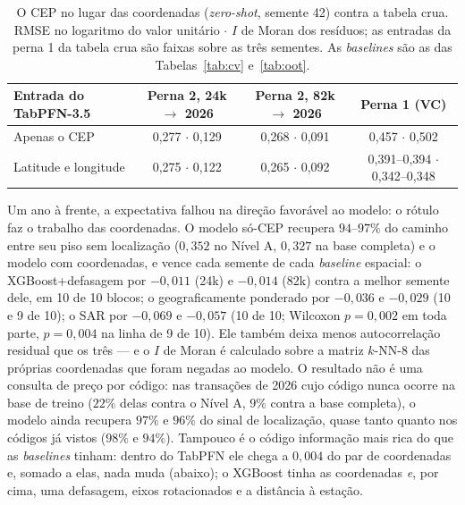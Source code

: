 \documentclass[11pt,a4paper]{article}
\begin{document}
\begin{table}[h]
\centering\small
\caption{O CEP no lugar das coordenadas (\emph{zero-shot}, semente 42) contra a tabela crua.
RMSE no logaritmo do valor unitário $\cdot$ $I$ de Moran dos resíduos; as entradas da perna 1
da tabela crua são faixas sobre as três sementes. As \emph{baselines} são as das
Tabelas~\ref{tab:cv} e~\ref{tab:oot}.}
\label{tab:postal}
\footnotesize
\begin{tabular}{lccc}
\toprule
Entrada do TabPFN-3.5 & Perna 2, 24k $\to$ 2026 & Perna 2, 82k $\to$ 2026 & Perna 1 (VC) \\
\midrule
Apenas o CEP & 0,277 $\cdot$ 0,129 & 0,268 $\cdot$ 0,091 & 0,457 $\cdot$ 0,502 \\
Latitude e longitude & 0,275 $\cdot$ 0,122 & 0,265 $\cdot$ 0,092 & 0,391--0,394 $\cdot$ 0,342--0,348 \\
\bottomrule
\end{tabular}
\end{table}

Um ano à frente, a expectativa falhou na direção favorável ao modelo: o rótulo faz o trabalho
das coordenadas. O modelo só-CEP recupera $94$--$97\%$ do caminho entre seu piso sem
localização ($0{,}352$ no Nível A, $0{,}327$ na base completa) e o modelo com coordenadas, e
vence cada semente de cada \emph{baseline} espacial: o XGBoost+defasagem por $-0{,}011$ (24k) e
$-0{,}014$ (82k) contra a melhor semente dele, em 10 de 10 blocos; o geograficamente ponderado
por $-0{,}036$ e $-0{,}029$ (10 e 9 de 10); o SAR por $-0{,}069$ e $-0{,}057$ (10 de 10;
Wilcoxon $p = 0{,}002$ em toda parte, $p = 0{,}004$ na linha de 9 de 10). Ele também deixa
menos autocorrelação residual que os três --- e o $I$ de Moran é calculado sobre a matriz
$k$-NN-8 das próprias coordenadas que foram negadas ao modelo. O resultado não é uma consulta
de preço por código: nas transações de 2026 cujo código nunca ocorre na base de treino
($22\%$ delas contra o Nível A, $9\%$ contra a base completa), o modelo ainda recupera $97\%$ e
$96\%$ do sinal de localização, quase tanto quanto nos códigos já vistos ($98\%$ e $94\%$).
Tampouco é o código informação mais rica do que as \emph{baselines} tinham: dentro do TabPFN
ele chega a $0{,}004$ do par de coordenadas e, somado a elas, nada muda (abaixo); o XGBoost
tinha as coordenadas \emph{e}, por cima, uma defasagem, eixos rotacionados e a distância à
estação.
\end{document}

